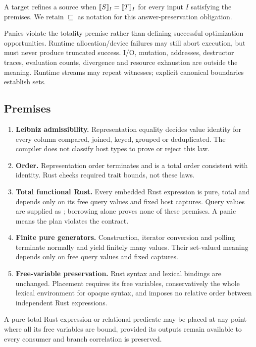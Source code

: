 \begin{definition}[Refinement]
A target refines a source when $\llbracket S\rrbracket_I=\llbracket T\rrbracket_I$ for every input $I$
satisfying the premises. We retain $\sqsubseteq$ as notation for this
answer-preservation obligation.
\end{definition}
Panics violate the totality premise rather than defining successful
optimization opportunities. Runtime allocation/device failures may still abort
execution, but must never produce truncated success. I/O, mutation, addresses,
destructor traces, evaluation counts, divergence and resource exhaustion are
outside the meaning. Runtime streams may repeat witnesses; explicit canonical
boundaries establish sets.

\subsection{Premises}
\label{sec:premises}
\begin{enumerate}
\item \textbf{Leibniz admissibility.} Representation equality decides value
identity for every column compared, joined, keyed, grouped or deduplicated.
The compiler does not classify host types to prove or reject this law.
\item \textbf{Order.} Representation order terminates and is a total order
consistent with identity. Rust checks required trait bounds, not these laws.
\item \textbf{Total functional Rust.} Every embedded Rust expression is pure,
total and depends only on its free query values and fixed host captures.
Query values are supplied as ; borrowing alone proves none of
these premises. A panic means the plan violates the contract.
\item \textbf{Finite pure generators.} Construction, iterator conversion and
polling terminate normally and yield finitely many values. Their set-valued
meaning depends only on free query values and fixed captures.
\item \textbf{Free-variable preservation.} Rust syntax and lexical bindings
are unchanged. Placement requires its free variables, conservatively the
whole lexical environment for opaque syntax, and imposes no relative order
between independent Rust expressions.
\end{enumerate}
\begin{lemma}[Motion]
A pure total Rust expression or relational predicate may be placed at any
point where all its free variables are bound, provided its outputs remain
available to every consumer and branch correlation is preserved.
\end{lemma}
